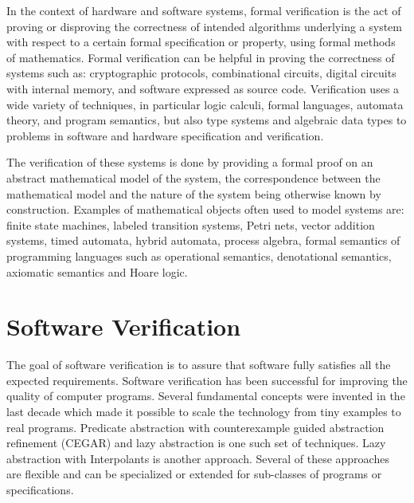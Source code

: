 \label{ch:intro}

In the context of hardware and software systems, formal verification is the act of proving or disproving the correctness of intended algorithms underlying a system with respect to a certain formal specification or property, using formal methods of mathematics. Formal verification can be helpful in proving the correctness of systems such as: cryptographic protocols, combinational circuits, digital circuits with internal memory, and software expressed as source code. Verification uses a wide variety of techniques, in particular logic calculi, formal languages, automata theory, and program semantics, but also type systems and algebraic data types to problems in software and hardware specification and verification.

The verification of these systems is done by providing a formal proof on an abstract mathematical model of the system, the correspondence between the mathematical model and the nature of the system being otherwise known by construction. Examples of mathematical objects often used to model systems are: finite state machines, labeled transition systems, Petri nets, vector addition systems, timed automata, hybrid automata, process algebra, formal semantics of programming languages such as operational semantics, denotational semantics, axiomatic semantics and Hoare logic.

\section{Software Verification}

The goal of software verification is to assure that software fully satisfies all the expected requirements. Software verification has been successful for improving the quality of computer programs. Several fundamental concepts were invented in the last decade which made it possible to scale the technology from tiny examples to real programs. Predicate abstraction \cite{ball01} with counterexample guided abstraction refinement (CEGAR) \cite{clarke03} and lazy abstraction \cite{henzinger02} is one such set of techniques. Lazy abstraction with Interpolants \cite{mcmillan06} is another approach. Several of these approaches are flexible and can be specialized or extended for sub-classes of programs or specifications.

